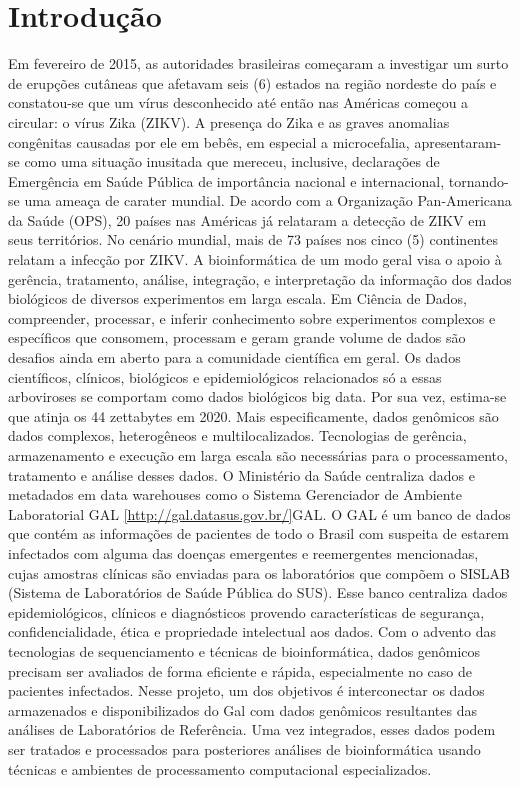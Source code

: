 \chapter{Introdução}

Em fevereiro de 2015, as autoridades brasileiras começaram a investigar um surto de erupções cutâneas que afetavam seis (6) estados na região nordeste do país e constatou-se que um vírus desconhecido até então nas Américas começou a circular: o vírus Zika (ZIKV). A presença do Zika e as graves anomalias congênitas causadas por ele em bebês, em especial a microcefalia, apresentaram-se como uma situação inusitada que mereceu, inclusive, declarações de Emergência em Saúde Pública de importância nacional e internacional, tornando-se uma ameaça de carater mundial.
De acordo com a Organização Pan-Americana da Saúde (OPS), 20 países nas Américas  já relataram a detecção de ZIKV em seus territórios. No cenário mundial, mais de 73 países nos cinco (5) continentes relatam a infecção por ZIKV.
A bioinformática de um modo geral visa o apoio à gerência, tratamento, análise, integração, e interpretação da informação dos dados biológicos de diversos experimentos em larga escala. Em Ciência de Dados, compreender, processar, e inferir conhecimento sobre experimentos complexos e específicos que consomem, processam e geram grande volume de dados são desafios ainda em aberto para a comunidade científica em geral. Os dados científicos, clínicos, biológicos e epidemiológicos relacionados só a essas arboviroses se comportam como dados biológicos big data. Por sua vez, estima-se que atinja os 44 zettabytes em 2020. Mais especificamente, dados genômicos são dados complexos, heterogêneos e multilocalizados. Tecnologias de gerência, armazenamento e execução em larga escala são necessárias para o processamento, tratamento e análise desses dados.
O Ministério da Saúde centraliza dados e metadados em data warehouses como o Sistema Gerenciador de Ambiente Laboratorial GAL \ref{http://gal.datasus.gov.br/}{GAL}.
O GAL é um banco de dados que contém as informações de pacientes de todo o Brasil com suspeita de estarem infectados com alguma das doenças emergentes e reemergentes mencionadas, cujas amostras clínicas são enviadas para os laboratórios que compõem o SISLAB (Sistema de Laboratórios de Saúde Pública do SUS). Esse banco centraliza dados epidemiológicos, clínicos e diagnósticos provendo características de segurança, confidencialidade, ética e propriedade intelectual aos dados.
Com o advento das tecnologias de sequenciamento e técnicas de bioinformática, dados genômicos precisam ser avaliados de forma eficiente e rápida, especialmente no caso de pacientes infectados. Nesse projeto, um dos objetivos é interconectar os dados armazenados e disponibilizados do Gal com dados genômicos resultantes das análises de Laboratórios de Referência. Uma vez integrados, esses dados podem ser tratados e processados para posteriores análises de bioinformática usando técnicas e ambientes de processamento computacional especializados.